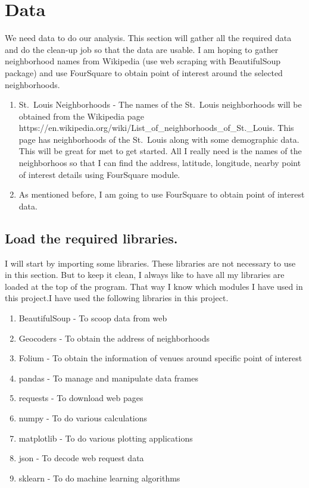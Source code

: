 \documentclass[11pt]{article}
\begin{document}
\hypertarget{data}{%
\section{Data}\label{data}}

We need data to do our analysis. This section will gather all the
required data and do the clean-up job so that the data are usable. I am
hoping to gather neighborhood names from Wikipedia (use web scraping
with BeautifulSoup package) and use FourSquare to obtain point of
interest around the selected neighborhoods.

\begin{enumerate}
\def\labelenumi{\arabic{enumi}.}
\item
  St.~Louis Neighborhoods - The names of the St.~Louis neighborhoods
  will be obtained from the Wikipedia page
  https://en.wikipedia.org/wiki/List\_of\_neighborhoods\_of\_St.\_Louis.
  This page has neighborhoods of the St.~Louis along with some
  demographic data. This will be great for met to get started. All I
  really need is the names of the neighborhoos so that I can find the
  address, latitude, longitude, nearby point of interest details using
  FourSquare module.
\item
  As mentioned before, I am going to use FourSquare to obtain point of
  interest data.
\end{enumerate}

    \hypertarget{load-the-required-libraries.}{%
\subsection{Load the required
libraries.}\label{load-the-required-libraries.}}

I will start by importing some libraries. These libraries are not
necessary to use in this section. But to keep it clean, I always like to
have all my libraries are loaded at the top of the program. That way I
know which modules I have used in this project.I have used the following libraries in this project.

\begin{enumerate}
\item BeautifulSoup - To scoop data from web
\item Geocoders - To obtain the address of neighborhoods
\item Folium - To obtain the information of venues around specific point of interest
\item pandas - To manage and manipulate data frames
\item requests - To download web pages
\item numpy - To do various calculations
\item matplotlib - To do various plotting applications
\item json - To decode web request data
\item sklearn - To do machine learning algorithms
\end{enumerate}
\newpage
    
\end{document}

